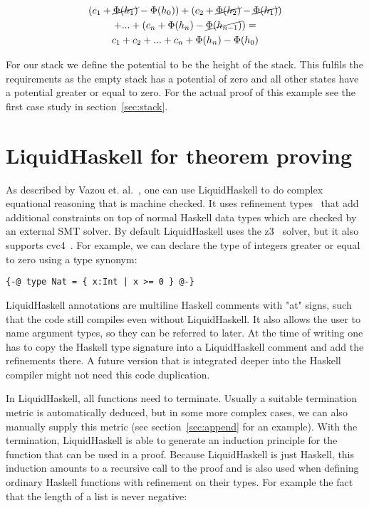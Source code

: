 \documentclass[sigplan,screen]{acmart}
\begin{document}
\begin{gather}
\nonumber (c_1 + \cancel{\Phi(h_1)} - \Phi(h_0)) + (c_2 + \cancel{\Phi(h_2)} - \cancel{\Phi(h_1)}) \\
\nonumber    + ... + (c_n + \Phi(h_n) - \cancel{\Phi(h_{n - 1})}) = \\
  c_1 + c_2 + ... + c_n + \Phi(h_n) - \Phi(h_0) \label{eq:sum}
\end{gather}

For our stack we define the potential to be the height of the stack. This fulfils the requirements as the empty stack has a potential of zero and all other states have a potential greater or equal to zero. For the actual proof of this example see the first case study in section~\ref{sec:stack}.

\section{LiquidHaskell for theorem proving}\label{sec:liquidhaskell}

As described by Vazou et. al.~\cite{tpfa}, one can use LiquidHaskell to do complex equational reasoning that is machine checked. It uses refinement types~\cite{refinement_types} that add additional constraints on top of normal Haskell data types which are checked by an external SMT solver. By default LiquidHaskell uses the z3~\cite{z3} solver, but it also supports cvc4~\cite{cvc4}. For example, we can declare the type of integers greater or equal to zero using a type synonym:

\begin{lstlisting}
{-@ type Nat = { x:Int | x >= 0 } @-}
\end{lstlisting}

LiquidHaskell annotations are multiline Haskell comments with "at" signs, such that the code still compiles even without LiquidHaskell. It also allows the user to name argument types, so they can be referred to later. At the time of writing one has to copy the Haskell type signature into a LiquidHaskell comment and add the refinements there. A future version that is integrated deeper into the Haskell compiler might not need this code duplication.

In LiquidHaskell, all functions need to terminate. Usually a suitable termination metric is automatically deduced, but in some more complex cases, we can also manually supply this metric (see section~\ref{sec:append} for an example). With the termination, LiquidHaskell is able to generate an induction principle for the function that can be used in a proof. Because LiquidHaskell is just Haskell, this induction amounts to a recursive call to the proof and is also used when defining ordinary Haskell functions with refinement on their types. For example the fact that the length of a list is never negative:
\end{document}
